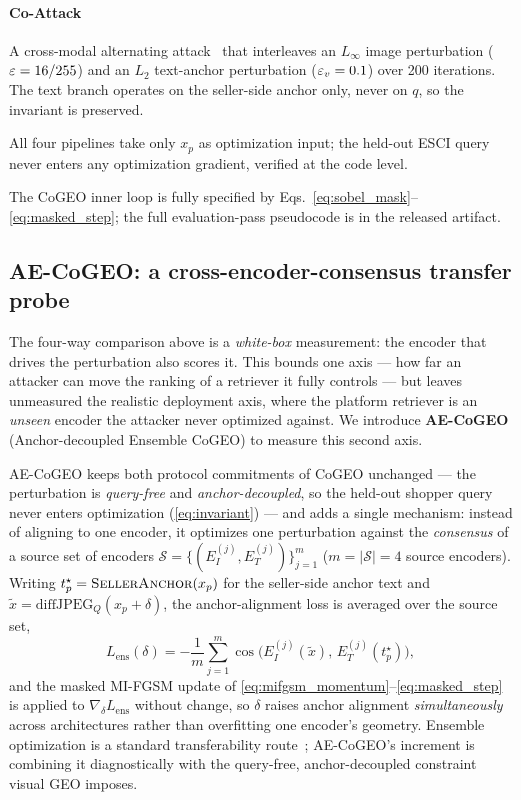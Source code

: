 \paragraph{Co-Attack} A cross-modal alternating attack~\cite{zhang2022coattack} that interleaves an $L_\infty$ image perturbation ($\varepsilon = 16/255$) and an $L_2$ text-anchor perturbation ($\varepsilon_v = 0.1$) over 200 iterations. The text branch operates on the seller-side anchor only, never on $q$, so the invariant is preserved.

All four pipelines take only $x_p$ as optimization input; the held-out ESCI query never enters any optimization gradient, verified at the code level.

The CoGEO inner loop is fully specified by Eqs.~\eqref{eq:sobel_mask}--\eqref{eq:masked_step}; the full evaluation-pass pseudocode is in the released artifact.

\subsection{AE-CoGEO: a cross-encoder-consensus transfer probe}
\label{sec:method:aecogeo}

The four-way comparison above is a \emph{white-box} measurement: the encoder that drives the perturbation also scores it. This bounds one axis --- how far an attacker can move the ranking of a retriever it fully controls --- but leaves unmeasured the realistic deployment axis, where the platform retriever is an \emph{unseen} encoder the attacker never optimized against. We introduce \textbf{AE-CoGEO} (Anchor-decoupled Ensemble CoGEO) to measure this second axis.

AE-CoGEO keeps both protocol commitments of CoGEO unchanged --- the perturbation is \emph{query-free} and \emph{anchor-decoupled}, so the held-out shopper query never enters optimization (\eqref{eq:invariant}) --- and adds a single mechanism: instead of aligning to one encoder, it optimizes one perturbation against the \emph{consensus} of a source set of encoders $\mathcal{S}=\{(E_I^{(j)}, E_T^{(j)})\}_{j=1}^{m}$ ($m=|\mathcal{S}|=4$ source encoders). Writing $t_p^{\star}=\textsc{SellerAnchor}(x_p)$ for the seller-side anchor text and $\tilde{x}=\mathrm{diffJPEG}_{Q}(x_p+\delta)$, the anchor-alignment loss is averaged over the source set,
\begin{equation}
L_{\mathrm{ens}}(\delta) = -\frac{1}{m}\sum_{j=1}^{m} \cos\bigl(E_I^{(j)}(\tilde{x}),\, E_T^{(j)}(t_p^{\star})\bigr),
\label{eq:ens_loss}
\end{equation}
and the masked MI-FGSM update of \eqref{eq:mifgsm_momentum}--\eqref{eq:masked_step} is applied to $\nabla_\delta L_{\mathrm{ens}}$ without change, so $\delta$ raises anchor alignment \emph{simultaneously} across architectures rather than overfitting one encoder's geometry. Ensemble optimization is a standard transferability route~\cite{papernot2017transferable,dong2018mifgsm,xie2019dim}; AE-CoGEO's increment is combining it diagnostically with the query-free, anchor-decoupled constraint visual GEO imposes.

